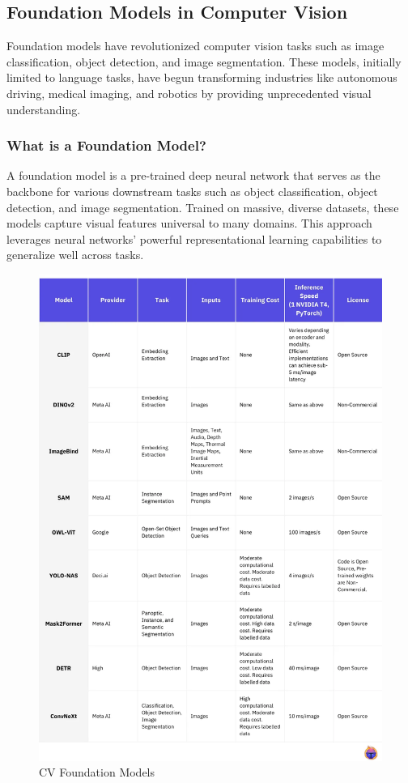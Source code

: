 \documentclass[12pt]{article}
\begin{document}
\subsection{Foundation Models in Computer Vision}

Foundation models have revolutionized computer vision tasks such as image classification, object detection, and image segmentation. These models, initially limited to language tasks, have begun transforming industries like autonomous driving, medical imaging, and robotics by providing unprecedented visual understanding.

\subsubsection{What is a Foundation Model?}

A foundation model is a pre-trained deep neural network that serves as the backbone for various downstream tasks such as object classification, object detection, and image segmentation. Trained on massive, diverse datasets, these models capture visual features universal to many domains. This approach leverages neural networks’ powerful representational learning capabilities to generalize well across tasks.

\begin{figure}[h]
    \centering
    \includegraphics[scale=0.3]{./media/cv_foundational_models.png}
    \caption{CV Foundation Models}
    \label{fig:foundation_cv}
\end{figure}
\end{document}
